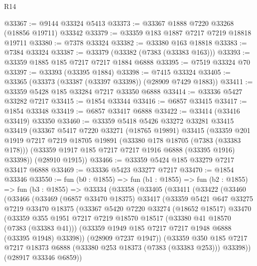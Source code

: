 \begin{lexlean}{R14}
\begin{coremodule}
@33367 := @9144 @33324 @5413
@33373 := @33367 @1888 @7220 @33268 (@18856 @19711) @33342
@33379 := @33359 @183 @1887 @7217 @7219 @18818 @19711
@33380 := @7378 @33324
@33382 := @33380 @163 @18818
@33383 := @7384 @33324
@33387 := @33379 (@33382 (@7383 (@33383 @163)))
@33393 := @33359 @1885 @185 @7217 @7217 @1884 @6888
@33395 := @7519 @33324 @70
@33397 := @33393 (@33395 @1884)
@33398 := @7415 @33324
@33405 := @33365 (@33373 (@33387 (@33397 @33398)) (@28909 @7429 @1883))
@33411 := @33359 @5428 @185 @33284 @7217 @33350 @6888
@33414 := @33336 @5427 @33282 @7217
@33415 := @1854 @33344
@33416 := @6857 @33415
@33417 := @1854 @33348
@33419 := @6857 @33417 @6888
@33422 := @33414 (@33416 @33419) @33350
@33460 := @33359
    @5418
    @5426
    @33272
    @33281
    @33415
    @33419
    (@33367
      @5417
      @7220
      @33271
      (@18765 @19891)
      @33415
      (@33359
        @201
        @1919
        @7217
        @7219
        @18705
        @19891
        (@33380 @178 @18705 (@7383 (@33383 @178)))
        (@33359 @1917 @185 @7217 @7217 @1916 @6888 (@33395 @1916) @33398))
      (@28910 @1915))
@33466 := @33359 @5424 @185 @33279 @7217 @33417 @6888
@33469 := @33336 @5423 @33277 @7217
@33470 := @1854 @33346
@33550 := fun (b0 : @1855) =>
  fun (b1 : @1855) =>
  fun (b2 : @1855) =>
  fun (b3 : @1855) =>
  @33334
    (@33358
      (@33405
        (@33411
          (@33422
            (@33460
              (@33466
                (@33469
                  (@6857 @33470 @18375)
                  @33417
                  (@33359
                    @5421
                    @647
                    @33275
                    @7219
                    @33470
                    @18375
                    (@33367
                      @5420
                      @7220
                      @33274
                      (@18652 @18517)
                      @33470
                      (@33359
                        @355
                        @1951
                        @7217
                        @7219
                        @18570
                        @18517
                        (@33380 @41 @18570 (@7383 (@33383 @41)))
                        (@33359 @1949 @185 @7217 @7217 @1948 @6888 (@33395 @1948) @33398))
                      (@28909 @7237 @1947))
                    (@33359
                      @350
                      @185
                      @7217
                      @7217
                      @18373
                      @6888
                      (@33380 @253 @18373 (@7383 (@33383 @253)))
                      @33398))
                  (@28917 @33346 @6859))

\end{coremodule}
\end{lexlean}

